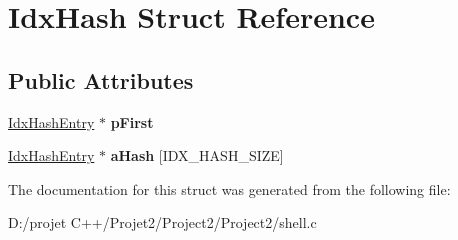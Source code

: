 \hypertarget{struct_idx_hash}{}\section{Idx\+Hash Struct Reference}
\label{struct_idx_hash}
\subsection*{Public Attributes}
\begin{DoxyCompactItemize}
\item 
\mbox{\label{struct_idx_hash_a18aa6c3f55cf0590a325e8736fe30c47}} 
\mbox{\hyperlink{struct_idx_hash_entry}{Idx\+Hash\+Entry}} $\ast$ {\bfseries p\+First}
\item 
\mbox{\label{struct_idx_hash_a744dcf8bbb96e5f620016d26c3acd716}} 
\mbox{\hyperlink{struct_idx_hash_entry}{Idx\+Hash\+Entry}} $\ast$ {\bfseries a\+Hash} \mbox{[}I\+D\+X\+\_\+\+H\+A\+S\+H\+\_\+\+S\+I\+ZE\mbox{]}
\end{DoxyCompactItemize}


The documentation for this struct was generated from the following file\+:\begin{DoxyCompactItemize}
\item 
D\+:/projet C++/\+Projet2/\+Project2/\+Project2/shell.\+c\end{DoxyCompactItemize}
